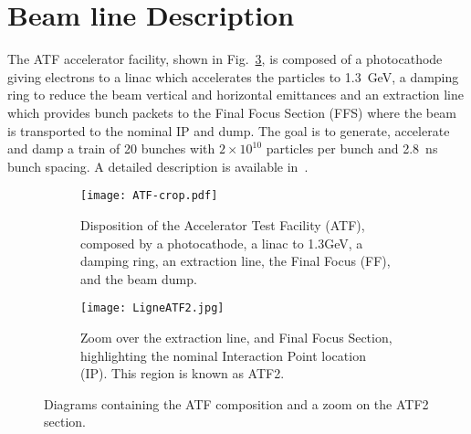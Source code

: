 \section{Beam line Description}
The ATF accelerator facility, shown in Fig.~\ref{f:ATF}, is composed of a photocathode giving electrons to a linac which accelerates the particles to 1.3~GeV, a damping ring to reduce the beam vertical and horizontal emittances and an extraction line which provides bunch packets to the Final Focus Section (FFS) where the beam is transported to the nominal IP and dump. The goal is to generate, accelerate and damp a train of 20 bunches with $2\times10^{10}$ particles per bunch and 2.8~ns bunch spacing. A detailed description is available in~\cite{ATF2prop,Alabau,Yves}.\par
\begin{figure}[htb]
\centering
\begin{subfigure}[b]{1.0\textwidth}
\texttt{[image: ATF-crop.pdf]}\caption{Disposition of the Accelerator Test Facility (ATF), composed by a photocathode, a linac to 1.3GeV, a damping ring, an extraction line, the Final Focus (FF), and the beam dump.}\label{f:ATF_ATF2}
\end{subfigure}
\begin{subfigure}[b]{1.0\textwidth}
\texttt{[image: LigneATF2.jpg]}\caption{Zoom over the extraction line, and Final Focus Section, highlighting the nominal Interaction Point location (IP). This region is known as ATF2.}\label{f:ATF2layout}
\end{subfigure}\caption{Diagrams containing the ATF composition and a zoom on the ATF2 section.}\label{f:ATF}
\end{figure}
